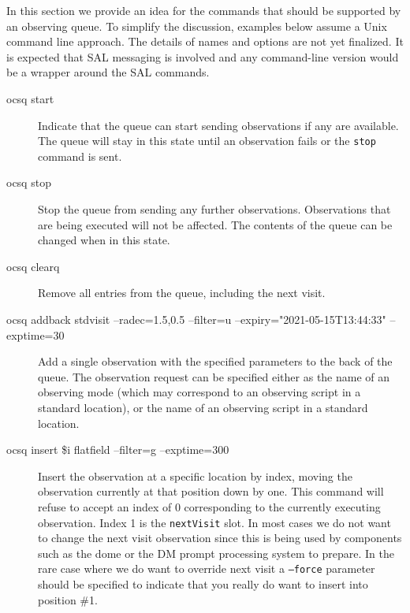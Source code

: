 \documentclass[TS,toc,lsstdraft]{lsstdoc}
\begin{document}
In this section we provide an idea for the commands that should be supported by an observing queue.
To simplify the discussion, examples below assume a Unix command line approach.
The details of names and options are not yet finalized.
It is expected that SAL messaging is involved and any command-line version would be a wrapper around the SAL commands.


\begin{description}

\item[ocsq start] \hfill

Indicate that the queue can start sending observations if any are available.
The queue will stay in this state until an observation fails or the \texttt{stop} command is sent.

\item[ocsq stop] \hfill

Stop the queue from sending any further observations.
Observations that are being executed will not be affected.
The contents of the queue can be changed when in this state.

\item[ocsq clearq] \hfill

Remove all entries from the queue, including the next visit.

\item[ocsq addback stdvisit --radec=1.5,0.5 --filter=u --expiry="2021-05-15T13:44:33" --exptime=30]

Add a single observation with the specified parameters to the back of the queue.
The observation request can be specified either as the name of an observing mode (which may correspond to an observing script in a standard location), or the name of an observing script in a standard location.

\item[ocsq insert \$i flatfield --filter=g --exptime=300]

Insert the observation at a specific location by index, moving the observation currently at that position down by one.
This command will refuse to accept an index of 0 corresponding to the currently executing observation.
Index 1 is the \texttt{nextVisit} slot.
In most cases we do not want to change the next visit observation since this is being used by components such as the dome or the DM prompt processing system to prepare.
In the rare case where we do want to override next visit a \texttt{--force} parameter should be specified to indicate that you really do want to insert into position \#1.


\end{description}
\end{document}

